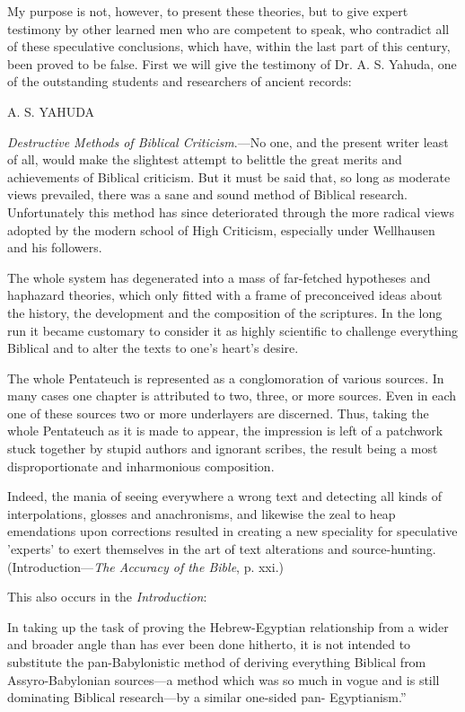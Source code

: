 My purpose is not, however, to present these theories, but to give expert testimony by other
learned men who are competent to speak, who contradict all of these speculative conclusions,
which have, within the last part of this century, been proved to be false. First we will give the
testimony of Dr. A. S. Yahuda, one of the outstanding students and researchers of ancient
records:

A. S. YAHUDA

\textit{Destructive Methods of Biblical Criticism}.—No one, and the present writer least of all, would
make the slightest attempt to belittle the great merits and achievements of Biblical criticism.
But it must be said that, so long as moderate views prevailed, there was a sane and sound
method of Biblical research. Unfortunately this method has since deteriorated through the
more radical views adopted by the modern school of High Criticism, especially under
Wellhausen and his followers.

The whole system has degenerated into a mass of far-fetched hypotheses and haphazard
theories, which only fitted with a frame of preconceived ideas about the history, the
development and the composition of the scriptures. In the long run it became customary to
consider it as highly scientific to challenge everything Biblical and to alter the texts to one's
heart's desire.

The whole Pentateuch is represented as a conglomoration of various sources. In many cases
one chapter is attributed to two, three, or more sources. Even in each one of these sources
two or more underlayers are discerned. Thus, taking the whole Pentateuch as it is made to
appear, the impression is left of a patchwork stuck together by stupid authors and ignorant
scribes, the result being a most disproportionate and inharmonious composition.

Indeed, the mania of seeing everywhere a wrong text and detecting all kinds of
interpolations, glosses and anachronisms, and likewise the zeal to heap emendations upon
corrections resulted in creating a new speciality for speculative 'experts' to exert themselves
in the art of text alterations and source-hunting. (Introduction—\textit{The Accuracy of the Bible}, p.
xxi.)

This also occurs in the \textit{Introduction}:

In taking up the task of proving the Hebrew-Egyptian relationship from a wider and broader
angle than has ever been done hitherto, it is not intended to substitute the pan-Babylonistic
method of deriving everything Biblical from Assyro-Babylonian sources—a method which
was so much in vogue and is still dominating Biblical research—by a similar one-sided pan-
Egyptianism.''

